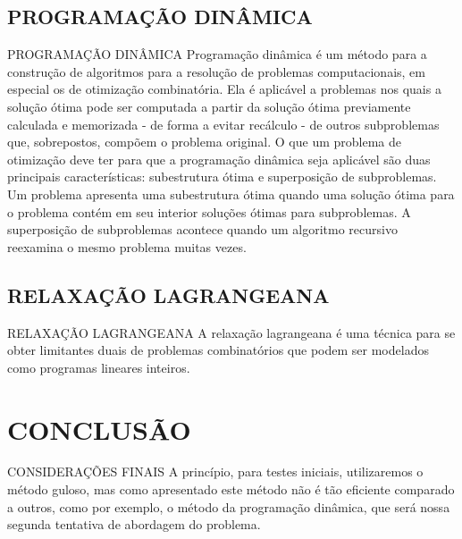 \documentclass[	english,			%
	brazil,]{beamer}
\begin{document}
\subsection{PROGRAMAÇÃO DINÂMICA}
\begin{frame}{PROGRAMAÇÃO DINÂMICA}
	Programação dinâmica é um método para a construção de algoritmos para a resolução de problemas computacionais, em especial os de otimização combinatória. Ela é aplicável a problemas nos quais a solução ótima pode ser computada a partir da solução ótima previamente calculada e memorizada - de forma a evitar recálculo - de outros subproblemas que, sobrepostos, compõem o problema original.
	O que um problema de otimização deve ter para que a programação dinâmica seja aplicável são duas principais características: subestrutura ótima e superposição de subproblemas. Um problema apresenta uma subestrutura ótima quando uma solução ótima para o problema contém em seu interior soluções ótimas para subproblemas. A superposição de subproblemas acontece quando um algoritmo recursivo reexamina o mesmo problema muitas vezes.
\end{frame}


\subsection{RELAXAÇÃO LAGRANGEANA}
\begin{frame}{RELAXAÇÃO LAGRANGEANA}
	A relaxação lagrangeana é uma técnica para se obter limitantes duais de problemas combinatórios que podem ser modelados como programas lineares inteiros.
\end{frame}

\section{CONCLUSÃO}
\begin{frame}{CONSIDERAÇÕES FINAIS}
A princípio, para testes iniciais, utilizaremos o método guloso, mas como apresentado este método não é tão eficiente comparado a outros, como por exemplo, o método da programação dinâmica, que será nossa segunda tentativa de abordagem do problema.
\end{frame}
\end{document}
